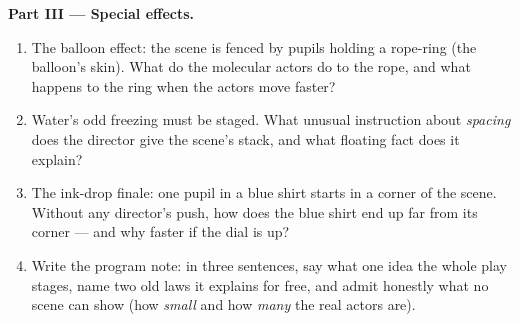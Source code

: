 \begin{problem}
\medskip\noindent\textbf{Part III --- Special effects.}
\begin{enumerate}[resume]
  \item The balloon effect: the  scene is fenced by pupils
        holding a rope-ring (the balloon's skin). What do the
        molecular actors do to the rope, and what happens to the
        ring when the actors move faster?
  \item Water's odd freezing must be staged. What unusual
        instruction about \emph{spacing} does the director give
        the  scene's stack, and what floating fact does it
        explain?
  \item The ink-drop finale: one pupil in a blue shirt starts in
        a corner of the \emph{} scene. Without any
        director's push, how does the blue shirt end up far from
        its corner --- and why faster if the  dial is up?
  \item Write the program note: in three sentences, say what one
        idea the whole play stages, name two old laws it explains
        for free, and admit honestly what no scene can show
        (how \emph{small} and how \emph{many} the real actors
        are).
\end{enumerate}
\end{problem}
